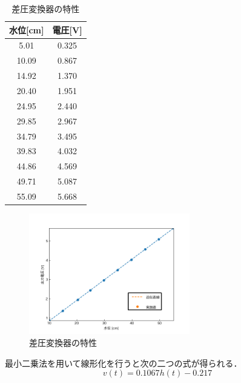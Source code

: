\documentclass[12pt]{jsarticle}
\begin{document}
\begin{table}[p]
  \begin{center}
    \label{Table-H-V}
    \caption{差圧変換器の特性}
    \begin{tabular}{|c|c|} \hline
      水位[cm] & 電圧[V] \\ \hline \hline
       5.01 & 0.325 \\ \hline
      10.09 & 0.867 \\ \hline
      14.92 & 1.370 \\ \hline
      20.40 & 1.951 \\ \hline
      24.95 & 2.440 \\ \hline
      29.85 & 2.967 \\ \hline
      34.79 & 3.495 \\ \hline
      39.83 & 4.032 \\ \hline
      44.86 & 4.569 \\ \hline
      49.71 & 5.087 \\ \hline
      55.09 & 5.668 \\ \hline
    \end{tabular}
  \end{center}
\end{table}
\begin{figure}[p]
  \begin{center}
    \includegraphics[clip,width=7.0cm]{../graph/approximity_HV.png}
    \caption{差圧変換器の特性}
    \label{Fig-H-V}
  \end{center}
\end{figure}
最小二乗法を用いて線形化を行うと次の二つの式が得られる．
\begin{equation}
  \label{}
  v(t) = 0.1067h(t) - 0.217
\end{equation}
\end{document}
